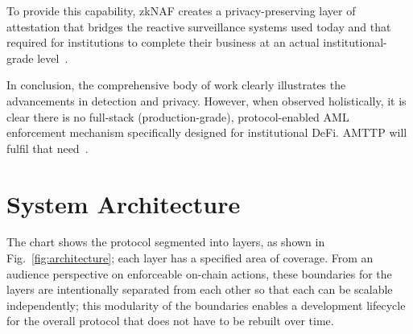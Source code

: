 \documentclass[journal]{IEEEtran}
\begin{document}
To provide this capability, zkNAF creates a privacy-preserving layer of attestation that bridges the reactive surveillance systems used today and that required for institutions to complete their business at an actual institutional-grade level~\cite{fca2025,fatf2023}.

In conclusion, the comprehensive body of work clearly illustrates the advancements in detection and privacy. However, when observed holistically, it is clear there is no full-stack (production-grade), protocol-enabled AML enforcement mechanism specifically designed for institutional DeFi. AMTTP will fulfil that need~\cite{sivaraju2024,ogunmola2025,campbell2026}.

\section{System Architecture}
\label{sec:arch}

The chart shows the protocol segmented into layers, as shown in Fig.~\ref{fig:architecture}; each layer has a specified area of coverage. From an audience perspective on enforceable on-chain actions, these boundaries for the layers are intentionally separated from each other so that each can be scalable independently; this modularity of the boundaries enables a development lifecycle for the overall protocol that does not have to be rebuilt over time.
\end{document}
